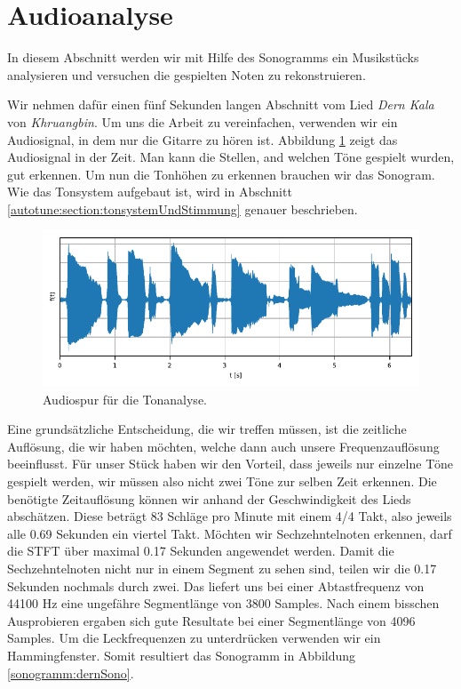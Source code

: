 %
%
%
%
\section{Audioanalyse
\label{sonogramm:section:teil2}}
In diesem Abschnitt werden wir mit Hilfe des Sonogramms ein Musikstücks
analysieren und versuchen die gespielten Noten zu rekonstruieren.

Wir nehmen dafür einen fünf Sekunden langen Abschnitt vom Lied
{\em Dern Kala} von {\em Khruangbin}.
%
%
Um uns die Arbeit zu vereinfachen, verwenden wir ein Audiosignal, in
dem nur die Gitarre zu hören ist.
Abbildung \ref{sonogramm:dernTime} zeigt das Audiosignal in der Zeit.
Man kann die Stellen, and welchen Töne gespielt wurden, gut erkennen.
Um nun die Tonhöhen zu erkennen brauchen wir das Sonogram.
Wie das Tonsystem aufgebaut ist, wird in Abschnitt \ref{autotune:section:tonsystemUndStimmung}
genauer beschrieben.
\begin{figure}
    \centering
    \includegraphics{papers/sonogramm/images/audioTimeDern.pdf}
    \caption{Audiospur für die Tonanalyse.
    \label{sonogramm:dernTime}
    }
\end{figure}

Eine grundsätzliche Entscheidung, die wir treffen müssen,
ist die zeitliche Auflösung, die wir haben möchten, welche 
dann auch unsere Frequenzauflösung beeinflusst.
Für unser Stück haben wir den Vorteil, dass jeweils nur einzelne
Töne gespielt werden, wir müssen also nicht zwei Töne zur selben 
Zeit erkennen.
Die benötigte Zeitauflösung können wir anhand der Geschwindigkeit des Lieds abschätzen.
Diese beträgt 83 Schläge pro Minute mit einem 4/4 Takt, also jeweils alle 0.69 Sekunden ein viertel Takt.
Möchten wir Sechzehntelnoten erkennen, darf die STFT über maximal 0.17 Sekunden
angewendet werden.
Damit die Sechzehntelnoten nicht nur in einem Segment zu sehen sind, teilen
wir die 0.17 Sekunden nochmals durch zwei.
Das liefert uns bei einer Abtastfrequenz von 44100 Hz eine ungefähre Segmentlänge von 
3800 Samples. 
Nach einem bisschen Ausprobieren ergaben sich gute Resultate bei einer Segmentlänge
von 4096 Samples.
Um die Leckfrequenzen zu unterdrücken verwenden wir ein Hammingfenster.
Somit resultiert das Sonogramm in Abbildung \ref{sonogramm:dernSono}.

